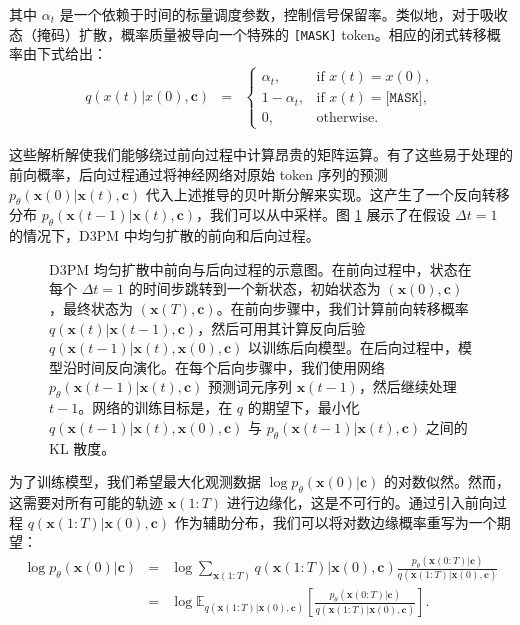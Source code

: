 \noindent 其中 $\alpha_t$ 是一个依赖于时间的标量调度参数，控制信号保留率。类似地，对于吸收态（掩码）扩散，概率质量被导向一个特殊的 \texttt{[MASK]} token。相应的闭式转移概率由下式给出：
\begin{eqnarray}
q(x(t) | x(0), \mathbf{c}) & = & \begin{cases} \alpha_t, & \text{if } x(t) = x(0), \\ 1 - \alpha_t, & \text{if } x(t) = \texttt{[MASK]}, \\ 0, & \text{otherwise.} \end{cases}
\end{eqnarray}

这些解析解使我们能够绕过前向过程中计算昂贵的矩阵运算。有了这些易于处理的前向概率，后向过程通过将神经网络对原始 token 序列的预测 $p_\theta(\mathbf{x}(0) | \mathbf{x}(t), \mathbf{c})$ 代入上述推导的贝叶斯分解来实现。这产生了一个反向转移分布 $p_\theta(\mathbf{x}(t - 1) | \mathbf{x}(t), \mathbf{c})$，我们可以从中采样。图 \ref{fig:d3pm-forward-and-reverse-processes} 展示了在假设 $\Delta t = 1$ 的情况下，D3PM 中均匀扩散的前向和后向过程。

\begin{figure}[!t]
\centering
{}
\caption{D3PM 均匀扩散中前向与后向过程的示意图。在前向过程中，状态在每个 $\Delta t = 1$ 的时间步跳转到一个新状态，初始状态为 $(\mathbf{x}(0), \mathbf{c})$，最终状态为 $(\mathbf{x}(T), \mathbf{c})$。在前向步骤中，我们计算前向转移概率 $q(\mathbf{x}(t) | \mathbf{x}(t - 1), \mathbf{c})$，然后可用其计算反向后验 $q(\mathbf{x}(t-1)| \mathbf{x}(t),\mathbf{x}(0),\mathbf{c})$ 以训练后向模型。在后向过程中，模型沿时间反向演化。在每个后向步骤中，我们使用网络 $p_\theta(\mathbf{x}(t-1)| \mathbf{x}(t),\mathbf{c})$ 预测词元序列 $\mathbf{x}(t-1)$，然后继续处理 $t - 1$。网络的训练目标是，在 $q$ 的期望下，最小化 $q(\mathbf{x}(t-1)| \mathbf{x}(t),\mathbf{x}(0),\mathbf{c})$ 与 $p_\theta(\mathbf{x}(t-1)| \mathbf{x}(t),\mathbf{c})$ 之间的 KL 散度。}
\label{fig:d3pm-forward-and-reverse-processes}
\end{figure}

为了训练模型，我们希望最大化观测数据 $\log p_\theta(\mathbf{x}(0) | \mathbf{c})$ 的对数似然。然而，这需要对所有可能的轨迹 $\mathbf{x}(1{:}T)$ 进行边缘化，这是不可行的。通过引入前向过程 $q(\mathbf{x}(1{:}T) | \mathbf{x}(0), \mathbf{c})$ 作为辅助分布，我们可以将对数边缘概率重写为一个期望：
\begin{eqnarray}
\log p_\theta(\mathbf{x}(0) | \mathbf{c}) & = & \log\sum_{\mathbf{x}(1{:}T)} q(\mathbf{x}(1{:}T) | \mathbf{x}(0), \mathbf{c}) \frac{p_\theta(\mathbf{x}(0{:}T) | \mathbf{c})}{q(\mathbf{x}(1{:}T) | \mathbf{x}(0), \mathbf{c})} \nonumber \\
& = & \log \mathbb{E}_{q(\mathbf{x}(1{:}T) | \mathbf{x}(0), \mathbf{c})} \left[ \frac{p_\theta(\mathbf{x}(0{:}T) | \mathbf{c})}{q(\mathbf{x}(1{:}T) | \mathbf{x}(0), \mathbf{c})} \right].
\end{eqnarray}

